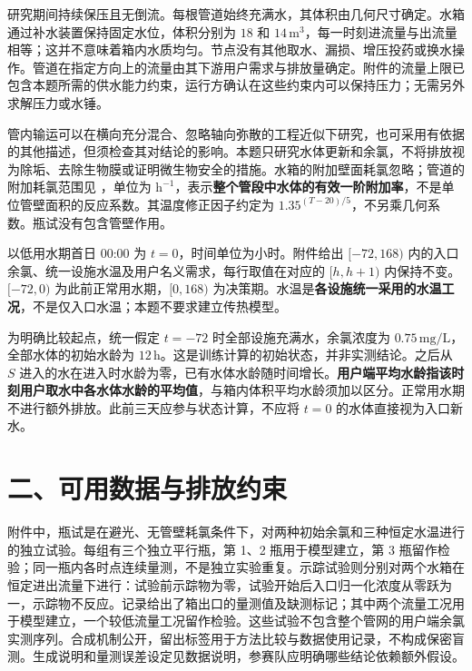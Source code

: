 \documentclass[11pt,a4paper]{article}
\newcommand{\filepath}[1]{\texttt{\detokenize{#1}}}
\begin{document}
研究期间持续保压且无倒流。每根管道始终充满水，其体积由几何尺寸确定。水箱通过补水装置保持固定水位，体积分别为 $18$ 和 $14\,\mathrm{m^3}$，每一时刻进流量与出流量相等；这并不意味着箱内水质均匀。节点没有其他取水、漏损、增压投药或换水操作。管道在指定方向上的流量由其下游用户需求与排放量确定。附件的流量上限已包含本题所需的供水能力约束，运行方确认在这些约束内可以保持压力；无需另外求解压力或水锤。

管内输运可以在横向充分混合、忽略轴向弥散的工程近似下研究，也可采用有依据的其他描述，但须检查其对结论的影响。本题只研究水体更新和余氯，不将排放视为除垢、去除生物膜或证明微生物安全的措施。水箱的附加壁面耗氯忽略；管道的附加耗氯范围见 \filepath{pipes.csv}，单位为 $\mathrm{h^{-1}}$，表示\textbf{整个管段中水体的有效一阶附加率}，不是单位管壁面积的反应系数。其温度修正因子约定为 $1.35^{(T-20)/5}$，不另乘几何系数。瓶试没有包含管壁作用。

以低用水期首日 00:00 为 $t=0$，时间单位为小时。附件给出 $[-72,168)$ 内的入口余氯、统一设施水温及用户名义需求，每行取值在对应的 $[h,h+1)$ 内保持不变。$[-72,0)$ 为此前正常用水期，$[0,168)$ 为决策期。水温是\textbf{各设施统一采用的水温工况}，不是仅入口水温；本题不要求建立传热模型。

为明确比较起点，统一假定 $t=-72$ 时全部设施充满水，余氯浓度为 $0.75\,\mathrm{mg/L}$，全部水体的初始水龄为 $12\,\mathrm{h}$。这是训练计算的初始状态，并非实测结论。之后从 $S$ 进入的水在进入时水龄为零，已有水体水龄随时间增长。\textbf{用户端平均水龄指该时刻用户取水中各水体水龄的平均值}，与箱内体积平均水龄须加以区分。正常用水期不进行额外排放。此前三天应参与状态计算，不应将 $t=0$ 的水体直接视为入口新水。

\section*{二、可用数据与排放约束}

附件中，瓶试是在避光、无管壁耗氯条件下，对两种初始余氯和三种恒定水温进行的独立试验。每组有三个独立平行瓶，第 1、2 瓶用于模型建立，第 3 瓶留作检验；同一瓶内各时点连续量测，不是独立实验重复。示踪试验则分别对两个水箱在恒定进出流量下进行：试验前示踪物为零，试验开始后入口归一化浓度从零跃为一，示踪物不反应。记录给出了箱出口的量测值及缺测标记；其中两个流量工况用于模型建立，一个较低流量工况留作检验。这些试验不包含整个管网的用户端余氯实测序列。合成机制公开，留出标签用于方法比较与数据使用记录，不构成保密盲测。生成说明和量测误差设定见数据说明，参赛队应明确哪些结论依赖额外假设。
\end{document}
